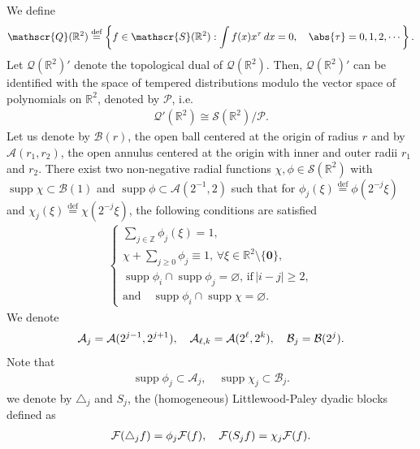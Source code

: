 \documentclass[twoside, reqno]{amsart}
\numberwithin{lemma}{section}
\numberwithin{theorem}{section}
\numberwithin{proposition}{section}
\numberwithin{equation}{section} %
\newcommand{\lpj}{\triangle_j}
\newcommand{\Acal}{\mathcal{A}}
\newcommand{\RR}{\mathbb{R}}
\newcommand{\ZZ}{\mathbb{Z}}
\newcommand{\Bcal}{\mathcal{B}}
\DeclareMathOperator{\supp}{supp}
\begin{document}
We define
	\begin{align*}
	\mathscr{Q}(\RR^2)\overset{\text{def}}{=}\left\{f\in \mathscr{S}(\RR^2): \int f(x)x^{\tau}\, dx=0, \quad \abs{\tau}=0,1,2,\cdots \right\}.
	\end{align*}
	Let $\mathscr{Q}(\RR^2)'$ denote the topological dual of $\mathscr{Q}(\RR^2)$. Then, $\mathscr{Q}(\RR^2)'$ can be identified with the space of tempered distributions modulo the vector space of polynomials on $\mathbb{R}^2$, denoted by $\mathscr{P}$, i.e.
	\begin{align*}
	\mathscr{Q}'(\RR^2)\cong\mathscr{S}(\RR^2)/\mathscr{P}.
	\end{align*}
	Let us denote by ${\Bcal}(r)$, the open ball centered at the origin of radius $r$ and by ${\Acal}(r_{1},r_{2})$, the open annulus centered at the origin with inner and outer radii $r_{1}$ and $r_{2}$. There exist two non-negative radial functions $\chi,\phi\in\mathscr{S}(\RR^2)$ with $\supp\chi\subset{\Bcal}(1)$ and $\supp\phi\subset{\Acal}(2^{-1},2)$ such that for $\phi_j(\xi)\overset{\text{def}}{=}\phi(2^{-j}\xi)$ and $\chi_j(\xi)\overset{\text{def}}{=}\chi(2^{-j}\xi)$, the following conditions are satisfied
	\begin{align*}
	    \begin{cases}
	    \sum_{j\in\ZZ}\phi_j(\xi)=1,\\
	    \chi+\sum_{j\geq0}\phi_j\equiv 1,\,\forall \xi\in\RR^2\setminus\{\mathbf{0}\},\\
	    \supp\phi_i\cap\supp\phi_j=\varnothing,\,\text{if}\,
	    |i-j|\geq2,\\
	    \text{and}\quad\supp\phi_i\cap\supp\chi =\varnothing.
	    \end{cases}
	\end{align*}
    We denote
    \begin{align}\notag            {\Acal}_{j}= {\Acal}(2^{j-1},2^{j+1}),\quad{\Acal}_{\ell,k}= {\Acal}(2^{\ell},2^{k}),\quad  {\Bcal}_j={\Bcal}(2^j).
        \end{align}
    Note that
	    \begin{align}\label{eq:rewrite:supp}
	        \supp\phi_j\subset{\Acal}_j,\quad \supp\chi_j\subset{\Bcal}_j.
	    \end{align}
	we denote by ${\lpj}$ and $S_{j}$, the (homogeneous) Littlewood-Paley dyadic blocks defined as
	\begin{align}\notag
	\mathcal{F}({\lpj}f)=\phi_{j}\mathcal{F}(f), \quad \mathcal{F}(S_{j}f)=\chi_{j}\mathcal{F}(f). 
	\end{align}
\end{document}
